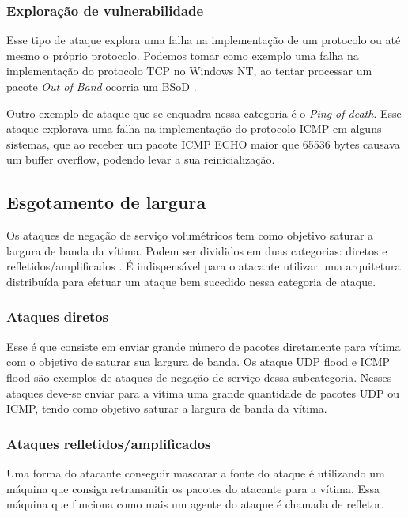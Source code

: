 \subsubsection*{ Exploração de vulnerabilidade }
Esse tipo de ataque explora uma falha na implementação de um protocolo ou até mesmo o próprio protocolo. Podemos tomar como exemplo uma falha na implementação do protocolo TCP no Windows NT, ao tentar processar um pacote \textit{Out of Band} ocorria um \acrfull{BSoD} \cite{OOB}.

Outro exemplo de ataque que se enquadra nessa categoria é o \textit{Ping of death}. Esse ataque explorava uma falha na implementação do protocolo \acrfull{ICMP} em alguns sistemas, que ao receber um pacote ICMP ECHO maior que 65536 bytes causava um buffer overflow, podendo levar a sua reinicialização\cite{PingofDeath}.

\subsection{ Esgotamento de largura }
Os ataques de negação de serviço volumétricos tem como objetivo saturar a largura de banda da vítima. Podem ser divididos em duas categorias: diretos e refletidos/amplificados \cite{Chang2002}. É indispensável para o atacante utilizar uma arquitetura distribuída para efetuar um ataque bem sucedido nessa categoria de ataque.

\subsubsection*{Ataques diretos}

Esse é que consiste em enviar grande número de pacotes diretamente para vítima com o objetivo de saturar sua largura de banda. Os ataque UDP flood e ICMP flood são exemplos de ataques de negação de serviço dessa subcategoria. Nesses ataques deve-se enviar para a vítima uma grande quantidade de pacotes UDP ou ICMP, tendo como objetivo saturar a largura de banda da vítima. 

\subsubsection*{Ataques refletidos/amplificados}

Uma forma do atacante conseguir mascarar a fonte do ataque é utilizando um
máquina que consiga retransmitir os pacotes do atacante para a vítima. Essa máquina que funciona como mais um agente do ataque é chamada de refletor. 

